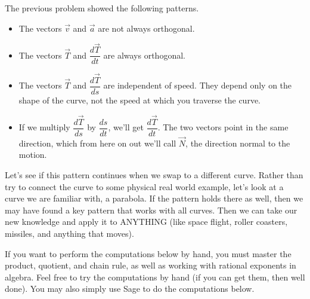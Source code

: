 \begin{observation}\label{curvature observations}
 The previous problem showed the following patterns.
\begin{itemize}
 \item The vectors $\vec v$ and $\vec a$ are not always orthogonal.
 \item The vectors $\vec T$ and $\dfrac{d\vec T}{dt}$ are always orthogonal.
 \item The vectors $\vec T$ and $\dfrac{d\vec T}{ds}$ are independent of speed. They depend only on the shape of the curve, not the speed at which you traverse the curve.
 \item If we multiply $\dfrac{d\vec T}{ds}$ by $\dfrac{ds}{dt}$, we'll get $\dfrac{d\vec T}{dt}$. The two vectors point in the same direction, which from here on out we'll call $\vec N$, the direction normal to the motion.
\end{itemize}
\end{observation}

Let's see if this pattern continues when we swap to a different curve. 
Rather than try to connect the curve to some physical real world example, let's look at a curve we are familiar with, a parabola. If the pattern holds there as well, then we may have found a key pattern that works with all curves.  Then we can take our new knowledge and apply it to ANYTHING (like space flight, roller coasters, missiles, and anything that moves).

If you want to perform the computations below by hand, you must master the product, quotient, and chain rule, as well as working with rational exponents in algebra. Feel free to try the computations by hand (if you can get them, then well done). You may also simply use Sage to do the computations below.



